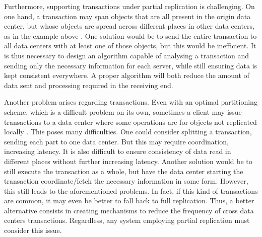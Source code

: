 
Furthermore, supporting transactions under partial replication is challenging.
On one hand, a transaction may span objects that are all present in the origin data center, but whose objects are spread across different places in other data centers, as in the example above \cite{spanner}.
One solution would be to send the entire transaction to all data centers with at least one of those objects, but this would be inefficient.
It is thus necessary to design an algorithm capable of analysing a transaction and sending only the necessary information for each server, while still ensuring data is kept consistent everywhere.
A proper algorithm will both reduce the amount of data sent and processing required in the receiving end.

Another problem arises regarding transactions.
Even with an optimal partitioning scheme, which is a difficult problem on its own, sometimes a client may issue transactions to a data center where some operations are for objects not replicated %
locally \cite{sipre}.
This poses many difficulties.
One could consider splitting a transaction, sending each part to one data center.
But this may require coordination, increasing latency. 
It is also difficult to ensure consistency of data read in different places without %
further increasing latency.
Another solution would be to still execute the transaction as a whole, but have the data center starting the transaction coordinate/fetch the necessary information in some form.
However, this still leads to the aforementioned problems.
In fact, if this kind of transactions are common, it may even be better to fall back to full replication. %
Thus, a better alternative consists in creating mechanisms to reduce the frequency of cross data centers transactions.
Regardless, any system employing partial replication must consider this issue. %

